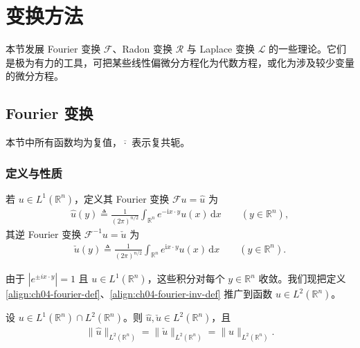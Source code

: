 \documentclass[../../main.tex]{subfiles}
\begin{document}
\section{变换方法}\label{section:ch04-transform}

本节发展 Fourier 变换 $\mathcal{F}$、Radon 变换 $\mathcal{R}$ 与 Laplace 变换 $\mathcal{L}$ 的一些理论。它们是极为有力的工具，可把某些线性偏微分方程化为代数方程，或化为涉及较少变量的微分方程。

\subsection{Fourier 变换}\label{subsection:ch04-fourier}

本节中所有函数均为复值，$\overline{\cdot}$ 表示复共轭。

\subsubsection{定义与性质}

\begin{definition}\label{definition:ch04-fourier}
若 $u\in L^1(\mathbb{R}^n)$，定义其 Fourier 变换 $\mathcal{F}u=\widehat{u}$ 为
\begin{align}\label{align:ch04-fourier-def}
\widehat{u}(y)\triangleq\frac{1}{(2\pi)^{n/2}}\int_{\mathbb{R}^n}e^{-\mathrm{i}x\cdot y}u(x)\,\mathrm{d}x \qquad(y\in\mathbb{R}^n),
\end{align}
其逆 Fourier 变换 $\mathcal{F}^{-1}u=\check{u}$ 为
\begin{align}\label{align:ch04-fourier-inv-def}
\check{u}(y)\triangleq\frac{1}{(2\pi)^{n/2}}\int_{\mathbb{R}^n}e^{\mathrm{i}x\cdot y}u(x)\,\mathrm{d}x \qquad(y\in\mathbb{R}^n).
\end{align}
\end{definition}

由于 $|e^{\pm ix\cdot y}|=1$ 且 $u\in L^1(\mathbb{R}^n)$，这些积分对每个 $y\in\mathbb{R}^n$ 收敛。我们现把定义\eqref{align:ch04-fourier-def}、\eqref{align:ch04-fourier-inv-def} 推广到函数 $u\in L^2(\mathbb{R}^n)$。

\begin{theorem}[Plancherel定理]\label{theorem:Plancherel定理}设 $u\in L^1(\mathbb{R}^n)\cap L^2(\mathbb{R}^n)$。则 $\widehat{u},\check{u}\in L^2(\mathbb{R}^n)$，且
\begin{align}\label{align:ch04-plancherel}
\|\widehat{u}\|_{L^2(\mathbb{R}^n)}=\|\check{u}\|_{L^2(\mathbb{R}^n)}=\|u\|_{L^2(\mathbb{R}^n)}.
\end{align}
\end{theorem}
\end{document}
